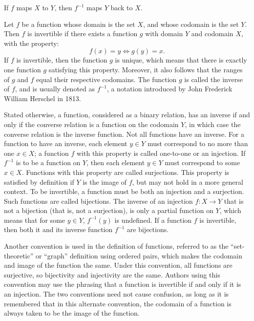 If $f$ maps $X$ to $Y$, then $f^{-1}$ maps $Y$ back to $X$.

Let $f$ be a function whose domain is the set $X$, and whose codomain is the set $Y$. Then $f$ is invertible if there exists a function $g$ with domain $Y$ and codomain $X$, with the property:
\[
f(x) = y \Leftrightarrow g(y) = x.
\]
If $f$ is invertible, then the function $g$ is unique, which means that there is exactly one function $g$ satisfying this property. Moreover, it also follows that the ranges of $g$ and $f$ equal their respective codomains. The function $g$ is called the inverse of $f$, and is usually denoted as $f^{-1}$, a notation introduced by John Frederick William Herschel in 1813.

Stated otherwise, a function, considered as a binary relation, has an inverse if and only if the converse relation is a function on the codomain $Y$, in which case the converse relation is the inverse function. Not all functions have an inverse. For a function to have an inverse, each element $y \in Y$ must correspond to no more than one $x \in X$; a function $f$ with this property is called one-to-one or an injection. If $f^{-1}$ is to be a function on $Y$, then each element $y \in Y$ must correspond to some $x \in X$. Functions with this property are called surjections. This property is satisfied by definition if $Y$ is the image of $f$, but may not hold in a more general context. To be invertible, a function must be both an injection and a surjection. Such functions are called bijections. The inverse of an injection $f: X \to Y$ that is not a bijection (that is, not a surjection), is only a partial function on $Y$, which means that for some $y \in Y$, $f^{-1}(y)$ is undefined. If a function $f$ is invertible, then both it and its inverse function $f^{-1}$ are bijections.


Another convention is used in the definition of functions, referred to as the
``set-theoretic'' or ``graph'' definition using ordered pairs, which makes the codomain
and image of the function the same. Under this convention, all functions are surjective,
so bijectivity and injectivity are the same. Authors using this convention may use the
phrasing that a function is invertible if and only if it is an injection. The two
conventions need not cause confusion, as long as it is remembered that in this alternate
convention, the codomain of a function is always taken to be the image of the function.

